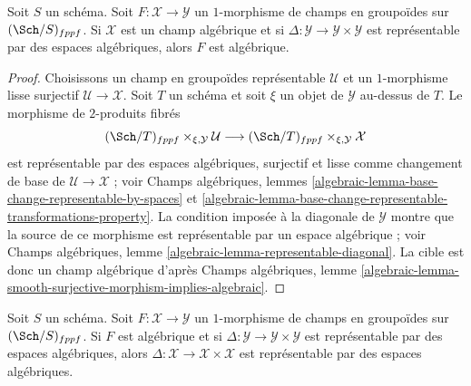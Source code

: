 \begin{lemma}
\label{lemma-map-from-algebraic}
Soit $S$ un schéma. Soit $F : \mathcal{X} \to \mathcal{Y}$ un $1$-morphisme
de champs en groupoïdes sur $(\Sch/S)_{fppf}$. Si $\mathcal{X}$ est un
champ algébrique et si $\Delta : \mathcal{Y} \to \mathcal{Y} \times \mathcal{Y}$
est représentable par des espaces algébriques, alors $F$ est algébrique.
\end{lemma}

\begin{proof}
Choisissons un champ en groupoïdes représentable $\mathcal{U}$ et un
$1$-morphisme lisse surjectif $\mathcal{U} \to \mathcal{X}$. Soit $T$ un schéma et
soit $\xi$ un objet de $\mathcal{Y}$ au-dessus de $T$. Le morphisme de
$2$-produits fibrés
$$
(\Sch/T)_{fppf} \times_{\xi, \mathcal{Y}} \mathcal{U}
\longrightarrow
(\Sch/T)_{fppf} \times_{\xi, \mathcal{Y}} \mathcal{X}
$$
est représentable par des espaces algébriques, surjectif et lisse comme
changement de base de $\mathcal{U} \to \mathcal{X}$ ; voir
Champs algébriques,
lemmes \ref{algebraic-lemma-base-change-representable-by-spaces} et
\ref{algebraic-lemma-base-change-representable-transformations-property}.
La condition imposée à la diagonale de $\mathcal{Y}$ montre que
la source de ce morphisme est représentable par un espace algébrique ; voir
Champs algébriques, lemme \ref{algebraic-lemma-representable-diagonal}.
La cible est donc un champ algébrique d'après
Champs algébriques,
lemme \ref{algebraic-lemma-smooth-surjective-morphism-implies-algebraic}.
\end{proof}

\begin{lemma}
\label{lemma-diagonals-and-algebraic-morphisms}
Soit $S$ un schéma. Soit $F : \mathcal{X} \to \mathcal{Y}$ un $1$-morphisme
de champs en groupoïdes sur $(\Sch/S)_{fppf}$.
Si $F$ est algébrique et si
$\Delta : \mathcal{Y} \to \mathcal{Y} \times \mathcal{Y}$
est représentable par des espaces algébriques, alors
$\Delta : \mathcal{X} \to \mathcal{X} \times \mathcal{X}$
est représentable par des espaces algébriques.
\end{lemma}

